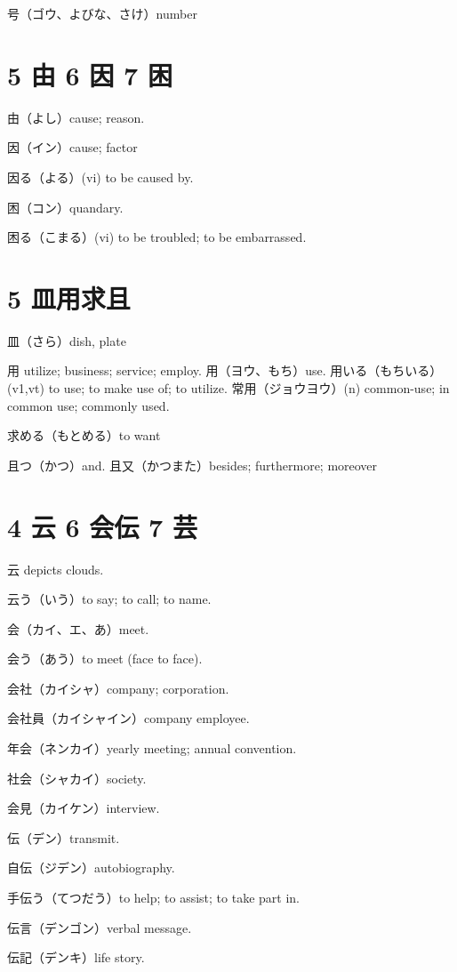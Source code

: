 号（ゴウ、よびな、さけ）number

\section{5 由 6 因 7 困}

由（よし）cause; reason.

因（イン）cause; factor

因る（よる）(vi) to be caused by.

困（コン）quandary.

困る（こまる）(vi) to be troubled; to be embarrassed.

\section{5 皿用求且}

皿（さら）dish, plate

用 utilize; business; service; employ.
用（ヨウ、もち）use.
用いる（もちいる）(v1,vt) to use; to make use of; to utilize.
常用（ジョウヨウ）(n) common-use; in common use; commonly used.

求める（もとめる）to want

且つ（かつ）and.
且又（かつまた）besides; furthermore; moreover

\section{4 云 6 会伝 7 芸}

云 depicts clouds.

云う（いう）to say; to call; to name.

会（カイ、エ、あ）meet.

会う（あう）to meet (face to face).

会社（カイシャ）company; corporation.

会社員（カイシャイン）company employee.

年会（ネンカイ）yearly meeting; annual convention.

社会（シャカイ）society.

会見（カイケン）interview.

伝（デン）transmit.

自伝（ジデン）autobiography.

手伝う（てつだう）to help; to assist; to take part in.

伝言（デンゴン）verbal message.

伝記（デンキ）life story.


